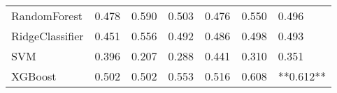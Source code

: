 \begin{tabular}{lllllll}
                   RandomForest & 0.478 &                     0.590 &                 0.503 &                  0.476 &                                   0.550 &     0.496 \\
                RidgeClassifier & 0.451 &                     0.556 &                 0.492 &                  0.486 &                                   0.498 &     0.493 \\
                            SVM & 0.396 &                     0.207 &                 0.288 &                  0.441 &                                   0.310 &     0.351 \\
                        XGBoost & 0.502 &                     0.502 &                 0.553 &                  0.516 &                                   0.608 & **0.612** \\
\bottomrule
\end{tabular}
